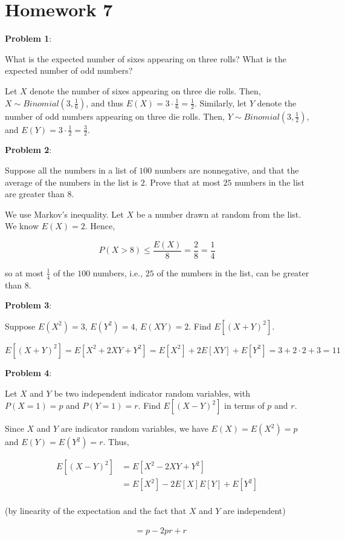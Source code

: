 \documentclass{article}
\begin{document}
\section{Homework 7}

\noindent\textbf{Problem 1}:

What is the expected number of sixes appearing on three rolls? What is the expected number of odd numbers? 

{\color{blue}

Let $X$ denote the number of sixes appearing on three die rolls. Then, $X\sim Binomial(3,\frac{1}{6})$, and thus $E(X)=3\cdot\frac{1}{6}=\frac{1}{2}$. Similarly, let $Y$ denote the number of odd numbers appearing on three die rolls. Then, $Y\sim Binomial(3,\frac{1}{2})$, and $E(Y)=3\cdot\frac{1}{2}=\frac{3}{2}$.

}

\noindent\textbf{Problem 2}: 

Suppose all the numbers in a list of $100$ numbers are nonnegative, and that the average of the numbers in the list is $2$. Prove that at most $25$ numbers in the list are greater than $8$.

{\color{blue}

We use Markov's inequality. Let $X$ be a number drawn at random from the list. We know $E(X)=2$. Hence,

\[P(X>8)\le\frac{E(X)}{8}=\frac{2}{8}=\frac{1}{4}\]

so at most $\frac{1}{4}$ of the $100$ numbers, i.e., $25$ of the numbers in the list, can be greater than $8$.

}

\noindent\textbf{Problem 3}: 

Suppose $E(X^2)=3$, $E(Y^2)=4$, $E(XY)=2$. Find $E[(X+Y)^2]$.

{\color{blue}

\[E[(X+Y)^2]=E[X^2+2XY+Y^2]=E[X^2]+2E[XY]+E[Y^2]=3+2\cdot2+3=11\]

}

\noindent\textbf{Problem 4}:

Let $X$ and $Y$ be two independent indicator random variables, with $P(X=1)=p$ and $P(Y=1)=r$. Find $E[(X-Y)^2]$ in terms of $p$ and $r$. 

{\color{blue}

Since $X$ and $Y$ are indicator random variables, we have $E(X)=E(X^2)=p$ and $E(Y)=E(Y^2)=r$. Thus,

\begin{align*}
    E[(X-Y)^2]&=E[X^2-2XY+Y^2]\\
    &=E[X^2]-2E[X]E[Y]+E[Y^2]\\
\end{align*}

(by linearity of the expectation and the fact that $X$ and $Y$ are independent)

\begin{align*}
    &=p-2pr+r
\end{align*}

}
\end{document}

